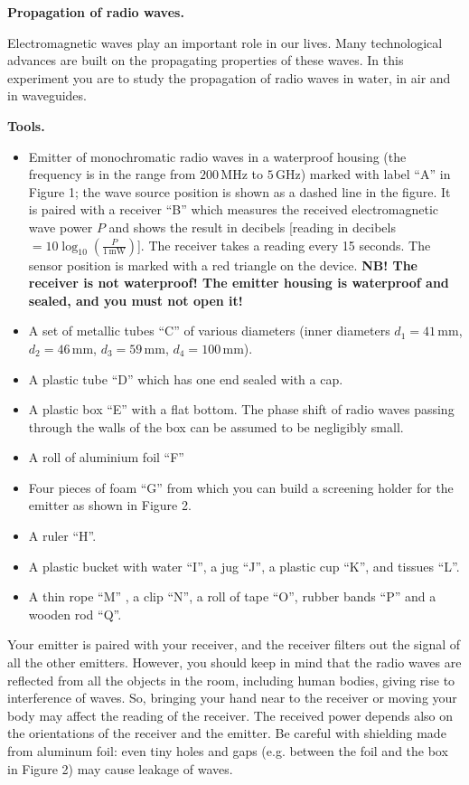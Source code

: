 \textbf{Propagation of radio waves.}

Electromagnetic waves play an important role in our lives. Many technological advances are built on the propagating properties of these waves. In this experiment you are to study the propagation of radio waves in water, in air and in waveguides.

\textbf{Tools.}

\begin{itemize}
\item Emitter of monochromatic radio waves in a waterproof housing (the frequency is in the range from $200\,\mathrm{MHz}$ to $5\,\mathrm{GHz}$) marked with label “A” in Figure 1; the wave source position is shown as a dashed line in the figure. It is paired with a receiver “B” which measures the received electromagnetic wave power $P$ and shows the result in decibels [reading in decibels $=10\log_{10}(\frac{P}{1\,\mathrm{mW}})$]. The receiver takes a reading every 15 seconds. The sensor position is marked with a red triangle on the device. \textbf{NB! The receiver is not waterproof! The emitter housing is waterproof and sealed, and you must not open it!}
\item A set of metallic tubes “C” of various diameters (inner diameters $d_1=41\,\mathrm{mm}$, $d_2=46\,\mathrm{mm}$, $d_3=59\,\mathrm{mm}$, $d_4=100\,\mathrm{mm}$).
\item A plastic tube “D” which has one end sealed with a cap.
\item A plastic box “E” with a flat bottom. The phase shift of radio waves passing through the walls of the box can be assumed to be negligibly small.
\item A roll of aluminium foil “F”
\item Four pieces of foam “G” from which you can build a screening holder for the emitter as shown in Figure 2.
\item A ruler “H”.
\item A plastic bucket with water “I”, a jug “J”, a plastic cup “K”, and tissues “L”.
\item A thin rope “M” , a clip “N”, a roll of tape “O”, rubber bands “P” and a wooden rod “Q”.
\end{itemize}

Your emitter is paired with your receiver, and the receiver filters out the signal of all the other emitters. However, you should keep in mind that the radio waves are reflected from all the objects in the room, including human bodies, giving rise to interference of waves. So, bringing your hand near to the receiver or moving your body may affect the reading of the receiver. The received power depends also on the orientations of the receiver and the emitter. Be careful with shielding made from aluminum foil: even tiny holes and gaps (e.g. between the foil and the box in Figure 2) may cause leakage of waves.

